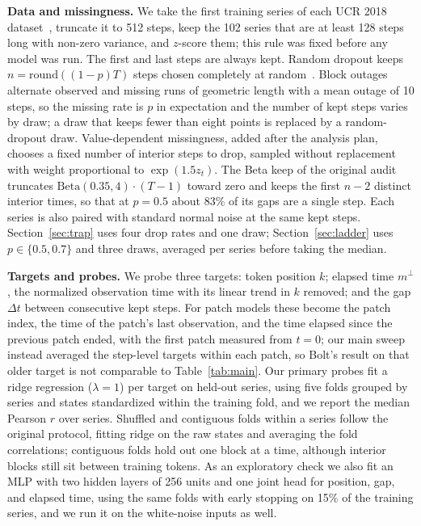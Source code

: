 \documentclass{article}
\newcommand{\mperp}{m^{\perp}}
\newcommand{\dt}{\Delta t}
\begin{document}
\textbf{Data and missingness.}
We take the first training series of each UCR 2018 dataset~\citep{dau2019ucr}, truncate it to 512 steps, keep the 102 series that are at least 128 steps long with non-zero variance, and $z$-score them; this rule was fixed before any model was run.
The first and last steps are always kept.
Random dropout keeps $n = \mathrm{round}((1-p)T)$ steps chosen completely at random~\citep{little2019missing}.
Block outages alternate observed and missing runs of geometric length with a mean outage of 10 steps, so the missing rate is $p$ in expectation and the number of kept steps varies by draw; a draw that keeps fewer than eight points is replaced by a random-dropout draw.
Value-dependent missingness, added after the analysis plan, chooses a fixed number of interior steps to drop, sampled without replacement with weight proportional to $\exp(1.5 z_t)$.
The Beta keep of the original audit truncates $\mathrm{Beta}(0.35,4)\cdot(T-1)$ toward zero and keeps the first $n-2$ distinct interior times, so that at $p = 0.5$ about 83\% of its gaps are a single step.
Each series is also paired with standard normal noise at the same kept steps.
Section~\ref{sec:trap} uses four drop rates and one draw; Section~\ref{sec:ladder} uses $p \in \{0.5, 0.7\}$ and three draws, averaged per series before taking the median.

\textbf{Targets and probes.}
We probe three targets: token position $k$; elapsed time $\mperp$, the normalized observation time with its linear trend in $k$ removed; and the gap $\dt$ between consecutive kept steps.
For patch models these become the patch index, the time of the patch's last observation, and the time elapsed since the previous patch ended, with the first patch measured from $t = 0$; our main sweep instead averaged the step-level targets within each patch, so Bolt's result on that older target is not comparable to Table~\ref{tab:main}.
Our primary probes fit a ridge regression ($\lambda = 1$) per target on held-out series, using five folds grouped by series and states standardized within the training fold, and we report the median Pearson $r$ over series.
Shuffled and contiguous folds within a series follow the original protocol, fitting ridge on the raw states and averaging the fold correlations; contiguous folds hold out one block at a time, although interior blocks still sit between training tokens.
As an exploratory check we also fit an MLP with two hidden layers of 256 units and one joint head for position, gap, and elapsed time, using the same folds with early stopping on 15\% of the training series, and we run it on the white-noise inputs as well.
\end{document}
